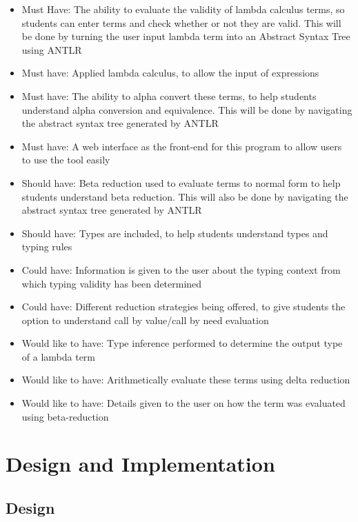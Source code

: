\documentclass[a4paper,11pt]{report}
\begin{document}
\begin{itemize}
	\item Must Have: The ability to evaluate the validity of lambda calculus terms, so students can enter terms and check whether or not they are valid. This will be done by turning the user input lambda term into an Abstract Syntax Tree using ANTLR
	\item Must have: Applied lambda calculus, to allow the input of expressions
	\item Must have: The ability to alpha convert these terms, to help students understand alpha conversion and equivalence. This will be done by navigating the abstract syntax tree generated by ANTLR
	\item Must have: A web interface as the front-end for this program to allow users to use the tool easily
	\item Should have: Beta reduction used to evaluate terms to normal form to help students understand beta reduction. This will also be done by navigating the abstract syntax tree generated by ANTLR
	\item Should have: Types are included, to help students understand types and typing rules
	\item Could have: Information is given to the user about the typing context from which typing validity has been determined
	\item Could have: Different reduction strategies being offered, to give students the option to understand call by value/call by need evaluation
	\item Would like to have: Type inference performed to determine the output type of a lambda term
	\item Would like to have: Arithmetically evaluate these terms using delta reduction
	\item Would like to have: Details given to the user on how the term was evaluated using beta-reduction 
\end{itemize}

\chapter{Design and Implementation}
\section{Design}
\end{document}
